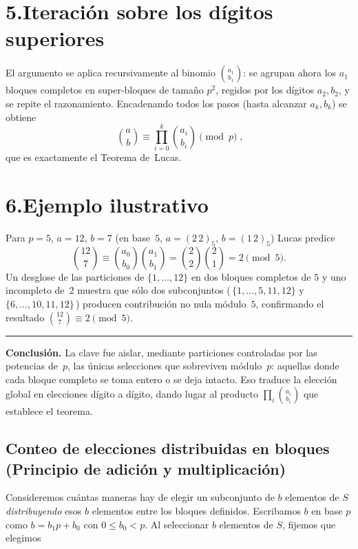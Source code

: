 \documentclass{article}
\begin{document}
\section*{5.\;Iteración sobre los dígitos superiores}

El argumento se aplica recursivamente al binomio
$\binom{a_1}{b_1}$: se agrupan ahora los $a_1$ bloques completos
en super‑bloques de tamaño $p^2$, regidos por los dígitos $a_2,b_2$,
y se repite el razonamiento.
Encadenando todos los pasos (hasta alcanzar $a_k,b_k$) se obtiene
\[
  \boxed{\;
    \displaystyle
    \binom{a}{b}
    \equiv
    \prod_{i=0}^k \binom{a_i}{b_i}
    \pmod{p}}\;,
\]
que es exactamente el Teorema de Lucas.

\section*{6.\;Ejemplo ilustrativo}

Para $p=5$, $a=12$, $b=7$ (en base $5$, $a=(2\,2)_5$, $b=(1\,2)_5$)
Lucas predice
\[
  \binom{12}{7}\equiv
  \binom{a_0}{b_0}\binom{a_1}{b_1}
  =\binom{2}{2}\binom{2}{1}=2\pmod{5}.
\]
Un desglose de las particiones de
$\{1,\dots,12\}$
en dos bloques completos de $5$ y uno incompleto de $2$
muestra que sólo dos subconjuntos
(\,$\{1,\dots,5,11,12\}$ y $\{6,\dots,10,11,12\}$\,)
producen contribución no nula módulo $5$, confirmando
el resultado $\binom{12}{7}\equiv 2\pmod5$.

\bigskip
\hrule
\bigskip

\noindent
\textbf{Conclusión.}  
La clave fue aislar, mediante particiones
controladas por las potencias de $p$, las únicas selecciones
que sobreviven módulo $p$:
aquellas donde cada bloque completo se toma entero o se deja intacto.
Eso traduce la elección global en elecciones dígito a dígito, dando lugar
al producto $\prod_i \binom{a_i}{b_i}$ que establece el teorema.

\subsection*{Conteo de elecciones distribuidas en bloques (Principio de adición y multiplicación)}

Consideremos cuántas maneras hay de elegir un subconjunto de $b$ elementos de $S$ \emph{distribuyendo} esos $b$ elementos entre los bloques definidos.  
Escribamos $b$ en base $p$ como $b = b_1 p + b_0$ con $0 \le b_0 < p$.  
Al seleccionar $b$ elementos de $S$, fijemos que elegimos
\end{document}
